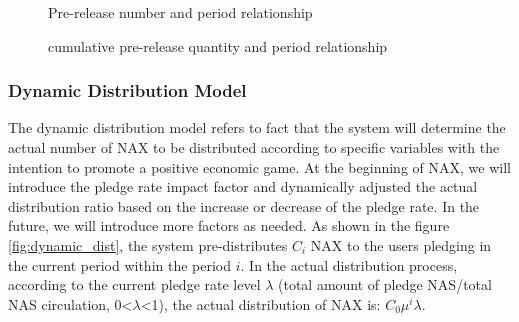 \begin{figure}[h]
\centering
\begin{minipage}[5cm]{.45\textwidth}
\centering
\caption{Pre-release number and period relationship}\label{dist}

\vspace{\baselineskip}
\end{minipage}\qquad
\begin{minipage}[5cm]{.45\textwidth}
\centering
\caption{cumulative pre-release quantity and period relationship}\label{acc}
\end{minipage}
\end{figure}

\subsubsection{Dynamic Distribution Model}
The dynamic distribution model refers to fact that the system will determine the actual number of NAX to be distributed according to specific variables with the intention to promote a positive economic game. At the beginning of NAX, we will introduce the pledge rate impact factor and dynamically adjusted the actual distribution ratio based on the increase or decrease of the pledge rate. In the future, we will introduce more  factors as needed. As shown in the figure \ref{fig:dynamic_dist}, the system pre-distributes $C_i$ NAX to the users pledging in the current period within the period $i$. In the actual distribution process, according to the current pledge rate level $\lambda$ (total amount of pledge NAS/total NAS circulation, 0<$\lambda$<1), the actual distribution of NAX is: $C_0 \mu ^i\lambda$.

